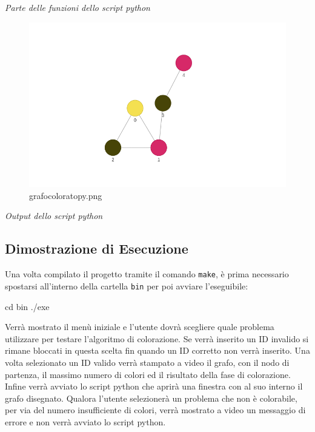 \documentclass[11pt]{article}
\newenvironment{Shaded}{}{}
\newcommand{\NormalTok}[1]{{#1}}
\newcommand{\BuiltInTok}[1]{{#1}}
\newcommand{\ExtensionTok}[1]{{#1}}
\begin{document}
\emph{Parte delle funzioni dello script python}

    \begin{figure}
\centering
\includegraphics{Colored Camel_files/grafocoloratopy.png}
\caption{grafocoloratopy.png}
\end{figure}

\emph{Output dello script python}

    \hypertarget{dimostrazione-di-esecuzione}{%
\subsection{\texorpdfstring{Dimostrazione di Esecuzione
}{Dimostrazione di Esecuzione }}\label{dimostrazione-di-esecuzione}}

    Una volta compilato il progetto tramite il comando \texttt{make}, è
prima necessario spostarsi all'interno della cartella \texttt{bin} per
poi avviare l'eseguibile:

\begin{Shaded}
\begin{Highlighting}[]
\BuiltInTok{cd}\NormalTok{ bin}
\ExtensionTok{./exe}
\end{Highlighting}
\end{Shaded}

Verrà mostrato il menù iniziale e l'utente dovrà scegliere quale
problema utilizzare per testare l'algoritmo di colorazione. Se verrà
inserito un ID invalido si rimane bloccati in questa scelta fin quando
un ID corretto non verrà inserito. Una volta selezionato un ID valido
verrà stampato a video il grafo, con il nodo di partenza, il massimo
numero di colori ed il risultato della fase di colorazione. Infine verrà
avviato lo script python che aprirà una finestra con al suo interno il
grafo disegnato. Qualora l'utente selezionerà un problema che non è
colorabile, per via del numero insufficiente di colori, verrà mostrato a
video un messaggio di errore e non verrà avviato lo script python.
\end{document}
